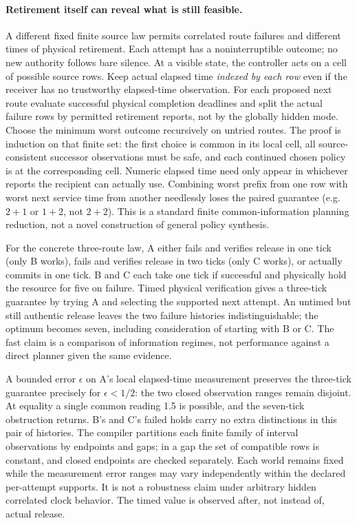 \documentclass{article}
\begin{document}
\paragraph{Retirement itself can reveal what is still feasible.}
A different fixed finite source law permits correlated route failures and different times of physical retirement. Each attempt has a noninterruptible outcome; no new authority follows bare silence. At a visible state, the controller acts on a cell of possible source rows. Keep actual elapsed time \emph{indexed by each row} even if the receiver has no trustworthy elapsed-time observation. For each proposed next route evaluate successful physical completion deadlines and split the actual failure rows by permitted retirement reports, not by the globally hidden mode. Choose the minimum worst outcome recursively on untried routes. The proof is induction on that finite set: the first choice is common in its local cell, all source-consistent successor observations must be safe, and each continued chosen policy is at the corresponding cell. Numeric elapsed time need only appear in whichever reports the recipient can actually use. Combining worst prefix from one row with worst next service time from another needlessly loses the paired guarantee (e.g. $2+1$ or $1+2$, not $2+2$). This is a standard finite common-information planning reduction, not a novel construction of general policy synthesis.

For the concrete three-route law, A either fails and verifies release in one tick (only B works), fails and verifies release in two ticks (only C works), or actually commits in one tick. B and C each take one tick if successful and physically hold the resource for five on failure. Timed physical verification gives a three-tick guarantee by trying A and selecting the supported next attempt. An untimed but still authentic release leaves the two failure histories indistinguishable; the optimum becomes seven, including consideration of starting with B or C. The fast claim is a comparison of information regimes, not performance against a direct planner given the same evidence.

A bounded error $\epsilon$ on A's local elapsed-time measurement preserves the three-tick guarantee precisely for $\epsilon<1/2$: the two closed observation ranges remain disjoint. At equality a single common reading 1.5 is possible, and the seven-tick obstruction returns. B's and C's failed holds carry no extra distinctions in this pair of histories. The compiler partitions each finite family of interval observations by endpoints and gaps; in a gap the set of compatible rows is constant, and closed endpoints are checked separately. Each world remains fixed while the measurement error ranges may vary independently within the declared per-attempt supports. It is not a robustness claim under arbitrary hidden correlated clock behavior. The timed value is observed after, not instead of, actual release.
\end{document}
